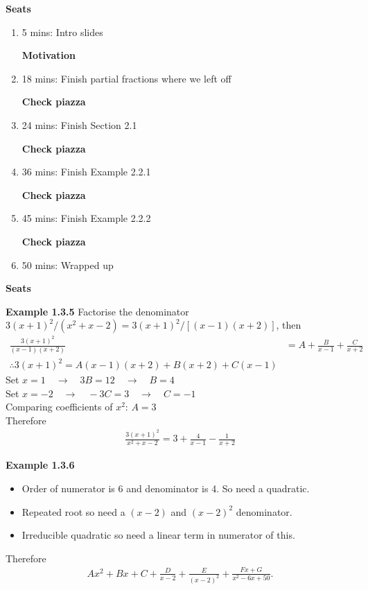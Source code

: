 \textbf{Seats}
\begin{enumerate}
    \item 5 mins: Intro slides \par
    \textbf{Motivation}
    \item 18 mins: Finish partial fractions where we left off \par
    \textbf{Check piazza}
    \item 24 mins: Finish Section 2.1 \par
    \textbf{Check piazza}
    \item 36 mins: Finish Example 2.2.1 \par
    \textbf{Check piazza}
    \item 45 mins: Finish Example 2.2.2 \par
    \textbf{Check piazza}
    \item 50 mins: Wrapped up
\end{enumerate}
\textbf{Seats}

\vspace{10mm}
\textbf{Example 1.3.5}
Factorise the denominator $3(x+1)^2/(x^2+x-2) = 3(x+1)^2/[(x - 1)(x + 2)]$, then
\begin{align*}
    \frac{3(x+1)^2}{(x - 1)(x + 2)} &= A + \frac{B}{x-1} + \frac{C}{x+2}\\
    \therefore 3(x+1)^2 = A(x-1)(x+2) + B(x+2) + C(x-1)
\end{align*}
Set $x=1 \quad \rightarrow \quad 3B=12 \quad \rightarrow \quad B=4$\\
Set $x=-2 \quad \rightarrow \quad -3C=3 \quad \rightarrow \quad C=-1$\\
Comparing coefficients of $x^2$: $A=3$\\
Therefore
\begin{align*}
    \frac{3(x+1)^2}{x^2+x-2} = 3 + \frac{4}{x-1} - \frac{1}{x+2}
\end{align*}

\vspace{10mm}
\textbf{Example 1.3.6}
\begin{itemize}
    \item Order of numerator is 6 and denominator is 4. So need a quadratic.
    \item Repeated root so need a $(x-2)$ and $(x-2)^2$ denominator.
    \item Irreducible quadratic so need a linear term in numerator of this.
\end{itemize}
Therefore
\begin{align*}
    Ax^2 + Bx + C + \frac{D}{x-2} + \frac{E}{(x-2)^2} + \frac{Fx+G}{x^2-6x+50}.
\end{align*}

